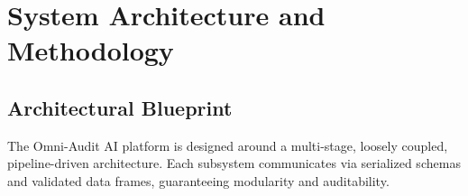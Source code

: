 \documentclass[11pt, a4paper]{article}
\begin{document}
\clearpage

\section{System Architecture and Methodology}

\subsection{Architectural Blueprint}
The Omni-Audit AI platform is designed around a multi-stage, loosely coupled, pipeline-driven architecture. Each subsystem communicates via serialized schemas and validated data frames, guaranteeing modularity and auditability.
\end{document}
